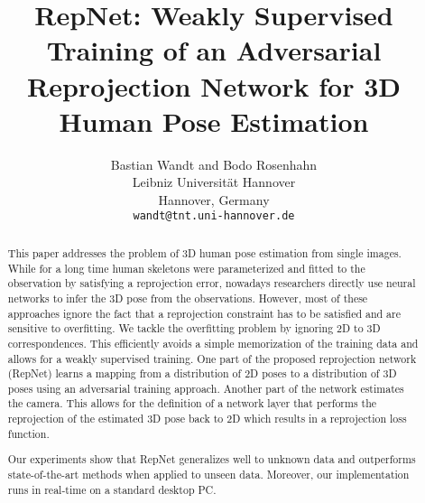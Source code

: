 \documentclass[10pt,twocolumn,letterpaper]{article}
\begin{document}
\title{RepNet: Weakly Supervised Training of an Adversarial Reprojection Network for 3D Human Pose Estimation}

\author{Bastian Wandt and Bodo Rosenhahn\\
Leibniz Universit\"at Hannover\\
Hannover, Germany\\
{\tt\small wandt@tnt.uni-hannover.de}
}

\maketitle


\begin{abstract}
This paper addresses the problem of 3D human pose estimation from single images.
While for a long time human skeletons were parameterized and fitted to the observation by satisfying a reprojection error, nowadays researchers directly use neural networks to infer the 3D pose from the observations. 
However, most of these approaches ignore the fact that a reprojection constraint has to be satisfied and are sensitive to overfitting.
We tackle the overfitting problem by ignoring 2D to 3D correspondences. 
This efficiently avoids a simple memorization of the training data and allows for a weakly supervised training.
One part of the proposed reprojection network (RepNet) learns a mapping from a distribution of 2D poses to a distribution of 3D poses using an adversarial training approach. 
Another part of the network estimates the camera.
This allows for the definition of a network layer that performs the reprojection of the estimated 3D pose back to 2D which results in a reprojection loss function.

Our experiments show that RepNet generalizes well to unknown data and outperforms state-of-the-art methods when applied to unseen data. Moreover, our implementation runs in real-time on a standard desktop PC.
\end{abstract}
\end{document}
